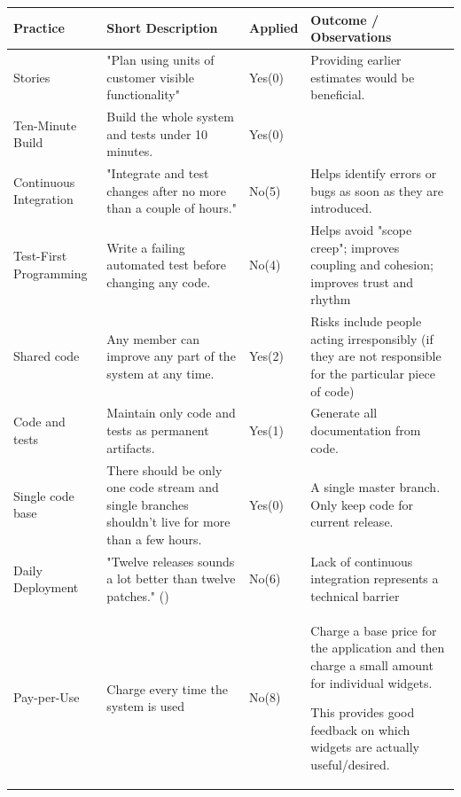 \documentclass[10pt]{report}
\begin{document}
\begin{center}

\begin{tabular} {p{2.25cm}|p{4.5cm}|p{1.5cm}|p{5cm}}
{\bf Practice} & {\bf Short Description} & {\bf Applied} & {\bf Outcome / Observations}\\
\hline

Stories & "Plan using units of customer visible functionality" \cite{extremep} & Yes(0) & Providing earlier estimates would be beneficial. \\
\hline

Ten-Minute Build & Build the whole system and tests under 10 minutes. & Yes(0) \\
\hline

Continuous Integration & "Integrate and test changes after no more than a couple of hours." \cite{extremep} & No(5) & Helps identify errors or bugs  as soon as they are introduced.  \\
\hline

Test-First Programming & Write a failing automated test before changing any code. & No(4) & Helps avoid "scope creep"; improves coupling and cohesion;
improves trust and rhythm \\
\hline

Shared code & Any member can improve any part of the system at any time. &
Yes(2) & Risks include people acting irresponsibly (if they are not responsible for the particular piece of code) \\
\hline

Code and tests & Maintain only code and tests as permanent artifacts. & Yes(1) & Generate all documentation from code. \\
\hline

Single code base & There should be only one code stream and single branches shouldn't live for more than a few hours. & Yes(0) & A single master branch.
Only keep code for current release. \\
\hline

Daily Deployment & "Twelve releases sounds a lot better than twelve patches." (\cite{extremep}) & No(6) & Lack of continuous integration represents a technical barrier \\
\hline

Pay-per-Use & Charge every time the system is used & No(8) & Charge a base price for the application and then charge a small amount for individual widgets.

This provides good feedback on which widgets are actually useful/desired.

\end{tabular}

\end{center}
\end{document}
